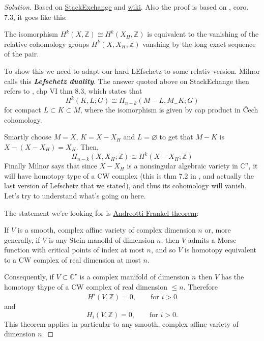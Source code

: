 \documentclass{article}
\newcommand{\Z}{\mathbb{Z}}
\newcommand{\C}{\mathbb{C}}
\begin{document}
\begin{proof}[Solution]
	Based on \href{https://math.stackexchange.com/questions/712791/application-of-lefschetz-duality-to-prove-lefschetz-hyperplane-theorem}{StackExchange} and \href{https://en.wikipedia.org/wiki/Lefschetz_hyperplane_theorem}{wiki}. Also the proof is based on \cite{milnor}, coro. 7.3, it goes like this:

	The isomorphism $H^{k}(X,\Z)\cong H^{k}(X_H,\Z)$ is equivalent to the vanishing of the relative cohomology groups $ H^{k}(X,X_H,\Z)$ vanshing by the long exact sequence of the pair.

	To show this we need to adapt our hard LEfschetz to some relativ version. Milnor calls this \textit{\textbf{Lefschetz duality}}. The answer quoted above on StackEchange then refers to \cite{bredon}, chp VI thm 8.3, which states that
\begin{equation*}
	H^{k}(K,L;G)\cong H_{n-k}(M-L,M_-K;G)
\end{equation*}
for compact $L\subset K\subset M$, where the isomorphism is given by cap product in \v Cech cohomology.

Smartly choose $M=X$, $K=X-X_H$ and $L=\varnothing$ to get that $M-K$ is $X-(X-X_H)=X_H$. Then,
\begin{equation*}
	H_{n-k}(X,X_H;\Z)\cong H^{k}(X-X_H;\Z)
\end{equation*}
Finally Milnor says that since $X-X_H$ is a nonsingular algebraic variety in $\C^n$, it will have homotopy type of a CW complex (this is thm 7.2 in \cite{milnor}, and actually the last version of Lefschetz that we stated), and thus its cohomology will vanish. Let's try to understand what's going on here.

The statement we're looking for is \href{https://en.wikipedia.org/wiki/Andreotti–Frankel_theorem}{Andreotti-Frankel theorem}:

\begin{thm}
	If $V$ is a smooth, complex affine variety of complex dimension $n$ or, more generally, if $V$ is any Stein manofld of dimension $n$, then $V$ admits a Morse function with critical points of index at most $n$, and so $V$ is homotopy equivalent to a CW complex of real dimension at most $n$. 
\end{thm}

Consequently, if $V\subset \C^{r}$ is a complex manifold of dimension $n$ then $V$ has the homotopy thype of a CW complex of real dimension $\le n$. Therefore
\begin{equation*}
	H^{i}(V,\Z)=0,\qquad \text{for }i>0
\end{equation*}
and
\begin{equation*}
	H_{i}(V,\Z)=0,\qquad\text{for }i>0.
\end{equation*}
This theorem applies in particular to any smooth, complex affine variety of dimension $n$.


\end{proof}
\end{document}
